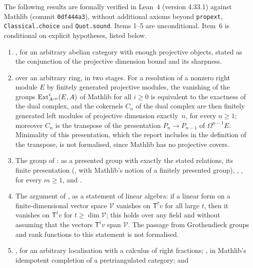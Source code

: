 The following results are formally verified in Lean~4 (version 4.33.1)
against Mathlib (commit \texttt{0df444a3}), without additional axioms beyond
\texttt{propext}, \texttt{Classical.choice} and \texttt{Quot.sound}. Items 1--5
are unconditional. Item~6 is conditional on explicit hypotheses, listed
below.
\begin{enumerate}
  \item {}, for an arbitrary abelian category with enough
    projective objects, stated as the conjunction of the projective dimension
    bound and its sharpness.
  \item {} over an arbitrary ring, in two stages. For
    a resolution of a nonzero right module $E$ by finitely generated projective
    modules, the vanishing of the groups $\operatorname{Ext}^i_{A^{\mathrm{op}}}(E,A)$
    of Mathlib for all ${i\geq0}$ is equivalent to the exactness of the dual
    complex, and the cokernels $C_n$ of the dual complex are then finitely
    generated left modules of projective dimension exactly~$n$, for every
    ${n\geq1}$; moreover $C_n$ is the transpose of the presentation
    ${P_n\to P_{n-1}}$ of $\Omega^{n-1}E$. Minimality of this presentation, which
    the report includes in the definition of the transpose, is not formalised,
    since Mathlib has no projective covers.
  \item The group of :  as a
    presented group with exactly the stated relations, its finite presentation
    (, with Mathlib's notion of a finitely
    presented group), ,
    ,  for every
    ${m\geq1}$, and .
  \item The argument of , as a statement of linear
    algebra: if a linear form on a finite-dimensional vector space $\mathcal{V}$
    vanishes on $\mathsf{T}^tv$ for all large $t$, then it vanishes on
    $\mathsf{T}^tv$ for ${t\geq\dim\mathcal{V}}$; this holds over any field and
    without assuming that the vectors $\mathsf{T}^tv$ span $\mathcal{V}$. The
    passage from Grothendieck groups and rank functions to this statement is
    not formalised.
  \item {}, for an arbitrary localisation with a calculus
    of right fractions; , in Mathlib's idempotent
    completion of a pretriangulated category; and 

\end{enumerate}
